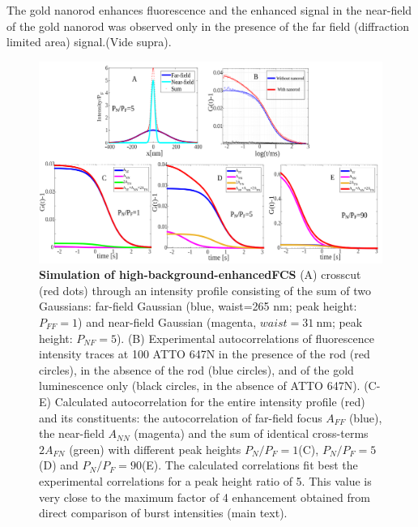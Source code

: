 The gold nanorod enhances fluorescence and the enhanced signal in the near-field of the gold nanorod was observed only in the presence of the far field (diffraction limited area) signal.(Vide supra).
\begin{figure}%
  \centering
  \includegraphics[width=\textwidth]{calc_enhc_corr}
  \makeatletter
  \renewcommand{\fnum@figure}{\figurename~S\thefigure}
  \makeatother{}
  \caption{\textbf{Simulation of high-background-enhancedFCS} (A) crosscut (red dots) through an intensity profile consisting of the sum of two Gaussians: far-field Gaussian (blue, waist=265 nm; peak height: $P_{FF}=1$) and near-field Gaussian (magenta, $waist=\SI{31}{\nm}$; peak height: $P_{NF}=5$).
  (B) Experimental autocorrelations of fluorescence intensity traces at \SI{100}{\nM} ATTO 647N in the presence of the rod (red circles), in the absence of the rod (blue circles), and of the gold luminescence only (black circles, in the absence of ATTO 647N).
  (C-E) Calculated autocorrelation for the entire intensity profile (red) and its constituents: the autocorrelation of far-field focus $A_{FF}$ (blue), the near-field $A_{NN}$ (magenta) and the 
  sum of identical cross-terms $2A_{FN}$ (green) with different peak heights $P_{N}/P_{F}=1$(C), $P_{N}/P_{F}=5$(D) and $P_{N}/P_{F}=90$(E).
  The calculated correlations fit best the experimental correlations for a peak height ratio of 5.
  This value is very close to the maximum factor of 4 enhancement obtained from direct comparison of burst intensities (main text).}
  \label{SIfig:calc_enhc_corr}
\end{figure}


